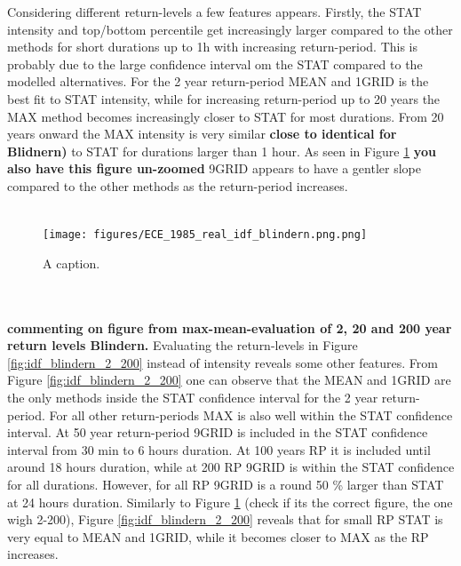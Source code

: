 Considering different return-levels a few features appears. Firstly, the STAT intensity and top/bottom percentile get increasingly larger compared to the other methods for short durations up to 1h with increasing return-period. This is probably due to the large confidence interval om the STAT compared to the modelled alternatives. For the 2 year return-period MEAN and 1GRID is the best fit to STAT intensity, while for increasing return-period up to 20 years the MAX method becomes increasingly closer to STAT for most durations. From 20 years onward the MAX intensity is very similar \textbf{close to identical for Blidnern)} to STAT for durations larger than 1 hour. As seen in Figure \ref{fig:intensity_blindern_200} \textbf{you also have this figure un-zoomed} 9GRID appears to have a gentler slope compared to the other methods as the return-period increases.  
\\
\\
\begin{figure}[hbt!]
    \centering
    \texttt{[image: figures/ECE\_1985\_real\_idf\_blindern.png.png]}
    \caption{A caption.}
    \label{fig:intensity_blindern_200}
\end{figure}
\\
\\
\textbf{commenting on figure from max-mean-evaluation of 2, 20 and 200 year return levels Blindern.} Evaluating the return-levels in Figure \ref{fig:idf_blindern_2_200} instead of intensity reveals some other features. From Figure \ref{fig:idf_blindern_2_200} one can observe that the MEAN and 1GRID are the only methods inside the STAT confidence interval for the 2 year return-period. For all other return-periods MAX is also well within the STAT confidence interval. At 50 year return-period 9GRID is included in the STAT confidence interval from 30 min to 6 hours duration. At 100 years RP it is included until around 18 hours duration, while at 200 RP 9GRID is within the STAT confidence for all durations. However, for all RP 9GRID is a round 50 \% larger than STAT at 24 hours duration. Similarly to Figure \ref{fig:intensity_blindern_200} (check if its the correct figure, the one wigh 2-200), Figure \ref{fig:idf_blindern_2_200} reveals that for small RP STAT is very equal to MEAN and 1GRID, while it becomes closer to MAX as the RP increases.

